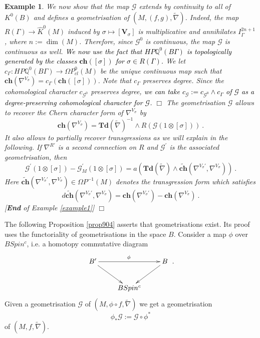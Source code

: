\documentclass[12pt]{article}
\newtheorem{ex}[theorem]{Example}
\newcommand{\cG}{{\mathcal{G}}}
\def\hB{\hspace*{\fill}$\Box$ \newline\noindent}
\newcommand{\Q}{{\mathbb{Q}}}
\newcommand{\Td}{{\mathbf{Td}}}
\newcommand{\ch}{{\mathbf{ch}}}
\newcommand{\bV}{{\mathbf{V}}}
\begin{document}
\begin{ex}
{We now show that
the map $\cG$ extends by continuity to all of $K^{0}(B)$
and defines a geometrisation of $(M,(f,g),\tilde \nabla)$.
 Indeed, the map
$R(\Gamma)\to \hat K^{0}(M)$ induced by  $\sigma\mapsto [\bV_{\sigma}]$ is multiplicative and annihilates $I^{2n+1}_{\Gamma}$, where $n:=\dim(M)$.
Therefore, since $\cG^{0}$ is continuous,  the map $\cG$ is continuous as well.  
\textcolor{black}{We now use the fact that $HP\Q^{0}(B\Gamma)$ is topologically generated by the classes $\ch([\sigma])$ for $\sigma\in R(\Gamma)$.}
We let $c_{\Gamma}:HP\Q^{0}(B\Gamma)\to \Omega P_{cl}^{0}(M)$ be the unique continuous map such that
$\ch(\nabla^{V_{\sigma}})=c_{\Gamma}(\ch([\sigma]))$. Note that $c_{\Gamma}$ preserves degree. Since the cohomological character  $c_{\cG^{0}}$   preserves degree, \textcolor{black}{we can take 
$c_{\cG}:=c_{\cG^{0}}\wedge c_{\Gamma}$ of $\cG$ as a degree-preserving cohomological character for $\cG$.} 
\hB 
The geometrisation $\cG$ allows to recover the Chern character form of $\nabla^{V_{\sigma}}$ by
$$\ch(\nabla^{V_{\sigma}})=\Td(\tilde \nabla)^{-1}\wedge R(\cG(1\otimes [\sigma]))\ .$$
It also allows to partially recover transgressions as we will explain in the following. If $\nabla^{R\prime}$ is a second connection on $R$ and
$\cG^{\prime}$ is the associated geometrisation,
then
$$\cG^{\prime}(1\otimes [\sigma])-\cG_{M}^{\prime}(1\otimes [\sigma])=a(\Td(\tilde \nabla)\wedge \tilde \ch(\nabla^{V_{\sigma}\prime},\nabla^{V_{\sigma}}))\ .$$
Here $\tilde \ch(\nabla^{V_{\sigma}\prime},\nabla^{V_{\sigma}})\in \Omega P^{-1}(M)$ denotes the transgression form which satisfies
$$ d\tilde \ch(\nabla^{V_{\sigma}\prime},\nabla^{V_{\sigma}})=\ch(\nabla^{V_{\sigma}\prime})-\ch(\nabla^{V_{\sigma}})\ .$$[\textbf{End} of Example \ref{example1}] \hB}
\end{ex}


The following Proposition \ref{prop904} asserts
that geometrisations exist. Its proof uses the functoriality of  geometrisations in the space $B$.
Consider a  map $\phi$ over $BSpin^{c}$, i.e. a homotopy commutative diagram
$$\xymatrix{B^{\prime}\ar[rr]^{\phi}\ar[dr]&&B\ar[dl]\\&BSpin^{c}&}\ .$$
Given a geometrisation $\cG$ of $(M,\phi\circ f,\tilde \nabla)$ we get a geometrisation
\begin{equation}\label{eq601}\phi_{*}\cG:=\cG\circ \phi^{*}\end{equation} of $(M,f,\tilde \nabla)$.
\end{document}
